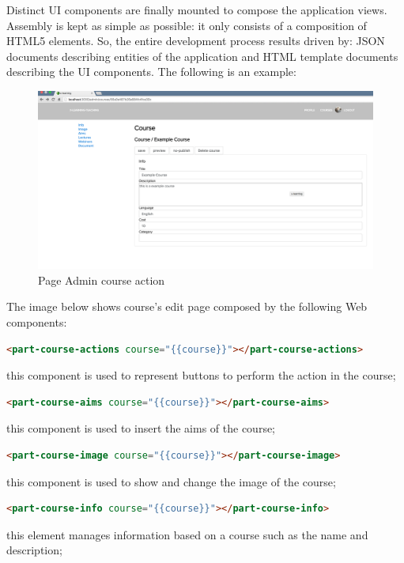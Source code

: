 Distinct UI components are finally mounted to compose the application views. Assembly is kept as simple as possible: it only consists of a composition of HTML5 elements. So, the entire development process results driven by: JSON documents describing entities of the application and HTML template documents describing the UI components.
The following is an example:

\begin{figure}[htb] %
 \centering
 \includegraphics[width=1.0\linewidth]{images/chapter4/page-course-admin.png}\hfill
 \caption[Page Admin course action]{Page Admin course action}
 \label{fig:fourV}
\end{figure}

The image below shows course's edit page composed by the following Web components:

\begin{lstlisting}[language=html]
<part-course-actions course="{{course}}"></part-course-actions>
\end{lstlisting}
this component is used to represent buttons to perform the action in the course;

\begin{lstlisting}[language=html]
<part-course-aims course="{{course}}"></part-course-aims>
\end{lstlisting}
this component is used to insert the aims of the course;

\begin{lstlisting}[language=html]
<part-course-image course="{{course}}"></part-course-image>
\end{lstlisting}
this component is used to show and change the image of the course;

\begin{lstlisting}[language=html]
<part-course-info course="{{course}}"></part-course-info>
\end{lstlisting}
this element manages information based on a course such as the name and description;


